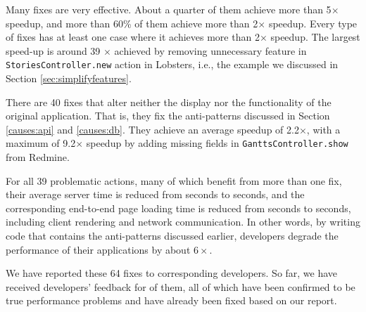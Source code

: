 Many fixes are very effective. About a quarter of them achieve more than 5$\times$ speedup, and more than 60\% of them achieve more than 2$\times$ speedup. Every type of fixes
has at least one case where it achieves more than 2$\times$ speedup. 
The largest speed-up is around 39 $\times $ achieved by removing unnecessary feature in \texttt{StoriesController.new} action in Lobsters, i.e., the example we discussed in Section \ref{sec:simplifyfeatures}. 

There are 40 fixes that alter neither the display nor the functionality of the original application. That is, they fix the anti-patterns discussed in Section \ref{causes:api} and \ref{causes:db}. They
achieve
an average speedup of 2.2$\times$, with a maximum of 9.2$\times$ speedup by adding missing fields in \texttt{GanttsController.show} from Redmine.

For all 39 problematic actions, many of which benefit from more than one fix, their average server time is reduced from \serverbefore seconds to \serverafter seconds, and the corresponding end-to-end page loading time is reduced from \eoebefore seconds to \eoeafter seconds, including client rendering and network communication. In other words, by writing code that contains the anti-patterns discussed earlier, developers degrade the performance of their applications by about $6\times$.

We have reported these 64 fixes to corresponding developers. So far, we have received developers' feedback for \numconfirmedpaissues of them, all of which have been confirmed to be true performance problems and \numfixedpaissues have already been fixed based on our report.%
\vspace{-0.08in} 
